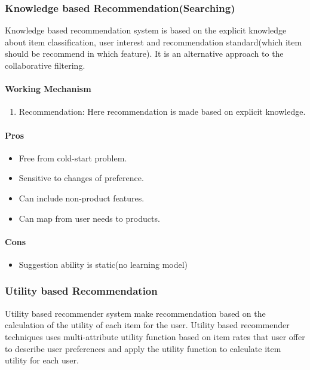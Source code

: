\subsubsection{Knowledge based Recommendation(Searching)}
Knowledge based recommendation system \cite{recommend} is based on the explicit knowledge about item classification, user interest and recommendation standard(which item should be recommend in which feature). It is an alternative approach to the collaborative filtering.
\paragraph{Working Mechanism}\hfill

\begin{enumerate}
	\item Recommendation: Here recommendation is made based on explicit knowledge.
\end{enumerate}
\paragraph{Pros}\hfill

\begin{itemize}
	\item Free from cold-start problem.
	\item Sensitive to changes of preference.
	\item Can include non-product features.
	\item Can map from user needs to products.
\end{itemize}
\paragraph{Cons}\hfill

\begin{itemize}
	\item Suggestion ability is static(no learning model)
\end{itemize}

\subsubsection{Utility based Recommendation}
Utility based recommender system make recommendation based on the calculation of the utility of each item for the user. Utility based recommender techniques uses multi-attribute utility function based on item rates that user offer to describe user preferences and apply the utility function to calculate item utility for each user.
